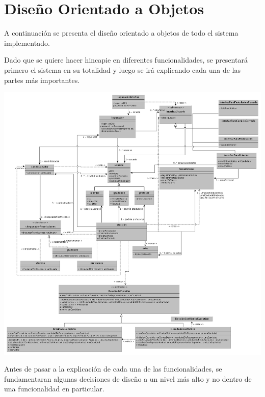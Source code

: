 \section{Dise\~{n}o Orientado a Objetos}

A continuaci\'on se presenta el diseño orientado a objetos de todo el sistema implementado.

Dado que se quiere hacer hincapie en diferentes funcionalidades, se presentar\'a primero el sistema en su totalidad y luego se ir\'a explicando cada una de las partes m\'as importantes.


\bigskip
\begin{center}
\includegraphics[scale=0.35]{diagramas/modeloClases.png} 
\end{center}
\bigskip


Antes de pasar a la explicaci\'on de cada una de las funcionalidades, se fundamentaran algunas decisiones de dise\~{n}o a un nivel m\'as alto y no dentro de una funcionalidad en particular.



